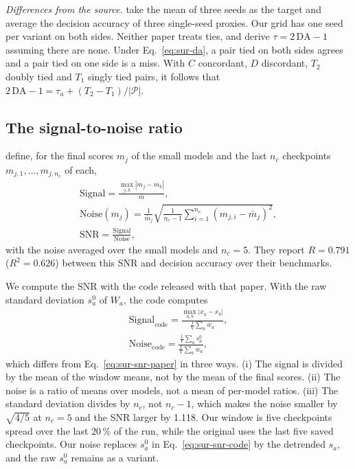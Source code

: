 \emph{Differences from the source.}
\citet{magnusson_datadecide_2025} take the mean of three seeds as the target and average the decision accuracy of three single-seed proxies. Our grid has one seed per variant on both sides.
Neither paper treats ties, and \citet{heineman_signal_2025} derive $\tau = 2\,\mathrm{DA} - 1$ assuming there are none.
Under Eq.~\ref{eq:sur-da}, a pair tied on both sides agrees and a pair tied on one side is a miss. With $C$ concordant, $D$ discordant, $T_2$ doubly tied and $T_1$ singly tied pairs, it follows that $2\,\mathrm{DA} - 1 = \tau_a + (T_2 - T_1)/|\mathcal{P}|$.

\subsection{The signal-to-noise ratio}
\label{app:sur-snr}

\citet{heineman_signal_2025} define, for the final scores $m_j$ of the small models and the last $n_c$ checkpoints $m_{j,1},\dots,m_{j,n_c}$ of each,
\begin{equation}
\begin{gathered}
\text{Signal} = \frac{\max_{j,k} |m_j - m_k|}{\bar{m}}, \\
\text{Noise}(m_j) = \frac{1}{\bar{m}_j}\sqrt{\frac{1}{n_c - 1}\sum_{i=1}^{n_c}(m_{j,i} - \bar{m}_j)^2}, \\
\mathrm{SNR} = \frac{\text{Signal}}{\text{Noise}},
\end{gathered}
\label{eq:sur-snr-paper}
\end{equation}
with the noise averaged over the small models and $n_c = 5$.
They report $R = 0.791$ ($R^2 = 0.626$) between this SNR and decision accuracy over their benchmarks.

We compute the SNR with the code released with that paper. With the raw standard deviation $s^{0}_a$ of $W_a$, the code computes
\begin{equation}
\begin{gathered}
\text{Signal}_{\text{code}} = \frac{\max_{a,b} |x_a - x_b|}{\frac{1}{V}\sum_a \bar{w}_a}, \\
\text{Noise}_{\text{code}} = \frac{\frac{1}{V}\sum_a s^{0}_a}{\frac{1}{V}\sum_a \bar{w}_a},
\end{gathered}
\label{eq:sur-snr-code}
\end{equation}
which differs from Eq.~\ref{eq:sur-snr-paper} in three ways.
(i) The signal is divided by the mean of the window means, not by the mean of the final scores.
(ii) The noise is a ratio of means over models, not a mean of per-model ratios.
(iii) The standard deviation divides by $n_c$, not $n_c - 1$, which makes the noise smaller by $\sqrt{4/5}$ at $n_c = 5$ and the SNR larger by 1.118.
Our window is five checkpoints spread over the last 20\,\% of the run, while the original uses the last five saved checkpoints. Our noise replaces $s^{0}_a$ in Eq.~\ref{eq:sur-snr-code} by the detrended $s_a$, and the raw $s^{0}_a$ remains as a variant.

